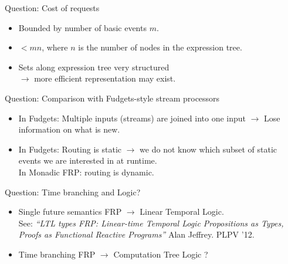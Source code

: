 \documentclass{beamer}
\begin{document}
\begin{frame}{Question: Cost of requests}
\begin{itemize}
\item Bounded by number of basic events $m$.
\item $< mn$, where $n$ is the number of nodes in the expression tree.
\item Sets along expression tree very structured \\$\rightarrow$ more efficient representation may exist.
\end{itemize}



\end{frame}

\begin{frame}{Question: Comparison with Fudgets-style stream processors}
\begin{itemize}
\item In Fudgets: Multiple inputs (streams) are joined into one input $\rightarrow$ Lose information on what is new.
\item In Fudgets: Routing is static $\rightarrow$ we do not know which subset of static events we are interested in \alert{at runtime}.\\ In Monadic FRP: routing is dynamic.
\end{itemize}


\end{frame}

\begin{frame}{Question: Time branching and Logic?}
\begin{itemize}
\item Single future semantics FRP  $\rightarrow$  Linear Temporal Logic.\\ See: \emph{``LTL types FRP:  Linear-time Temporal Logic Propositions as Types, Proofs as Functional Reactive Programs''} Alan Jeffrey. PLPV '12.
\item Time branching FRP $\rightarrow$ Computation Tree Logic ?
\end{itemize}


\end{frame}
\end{document}

